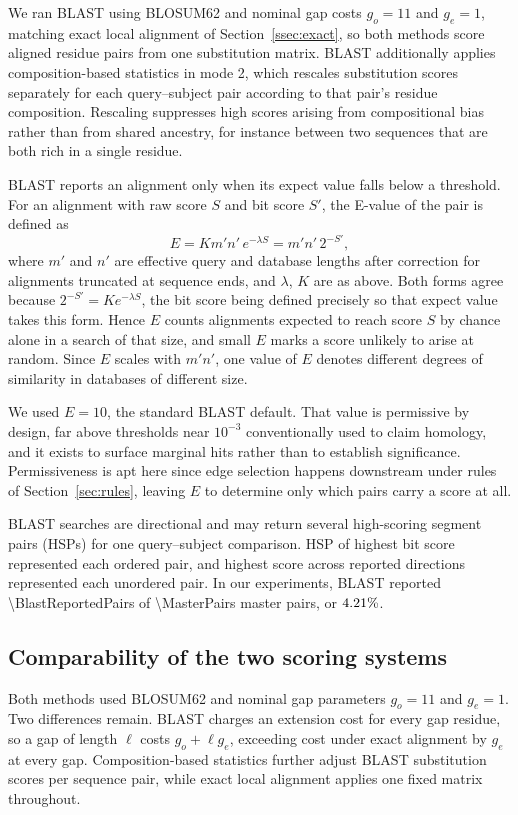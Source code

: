 \documentclass[11pt,a4paper]{article}
\begin{document}
We ran BLAST using BLOSUM62 and nominal gap costs \(g_o=11\) and \(g_e=1\), matching exact local
alignment of Section~\ref{ssec:exact}, so both methods score aligned residue
pairs from one substitution matrix. BLAST additionally applies
composition-based statistics in mode 2, which rescales substitution scores
separately for each query--subject pair according to that pair's residue
composition. Rescaling suppresses high scores arising from compositional bias
rather than from shared ancestry, for instance between two sequences that are both rich
in a single residue.

BLAST reports an alignment only when its expect value falls below a threshold.
For an alignment with raw score \(S\) and bit score \(S'\), the E-value of the pair is defined as
\[
E = K m'n'\,e^{-\lambda S} = m'n'\,2^{-S'},
\]
where \(m'\) and \(n'\) are effective query and database lengths after
correction for alignments truncated at sequence ends, and \(\lambda\), \(K\)
are as above. Both forms agree because \(2^{-S'}=Ke^{-\lambda S}\), the bit
score being defined precisely so that expect value takes this form. Hence \(E\)
counts alignments expected to reach score \(S\) by chance alone in a search of
that size, and small \(E\) marks a score unlikely to arise at random. Since
\(E\) scales with \(m'n'\), one value of \(E\) denotes different degrees of
similarity in databases of different size.

We used \(E=10\), the standard BLAST default. That value is permissive by
design, far above thresholds near \(10^{-3}\) conventionally used to claim
homology, and it exists to surface marginal hits rather than to establish
significance. Permissiveness is apt here since edge selection happens
downstream under rules of Section~\ref{sec:rules}, leaving \(E\) to determine
only which pairs carry a score at all.

BLAST searches are directional and may return several high-scoring segment
pairs (HSPs) for one query--subject comparison. HSP of highest bit score
represented each ordered pair, and highest score across reported directions
represented each unordered pair. In our experiments, BLAST reported \num{\BlastReportedPairs} of
\num{\MasterPairs} master pairs, or \(4.21\%\).

\subsection{Comparability of the two scoring systems}

Both methods used BLOSUM62 and nominal gap parameters \(g_o=11\) and \(g_e=1\). Two
differences remain. BLAST charges an extension cost for every gap residue, so a
gap of length \(\ell\) costs \(g_o+\ell g_e\), exceeding cost under exact alignment by
\(g_e\) at every gap. Composition-based statistics further adjust BLAST
substitution scores per sequence pair, while exact local alignment applies one
fixed matrix throughout.
\end{document}
